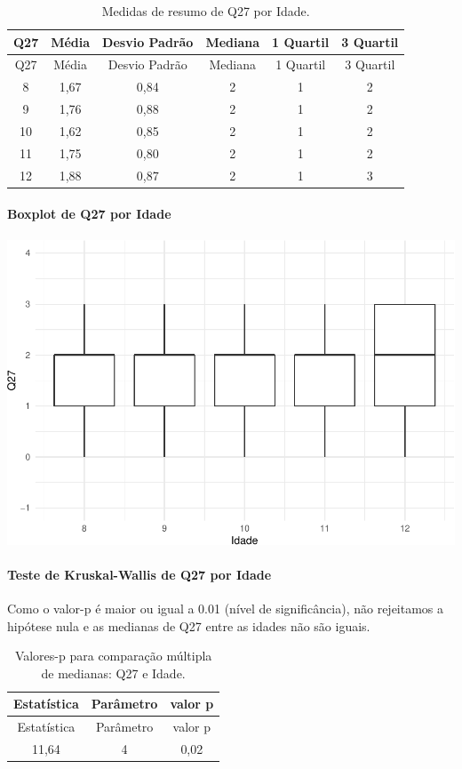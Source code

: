 \documentclass[]{article}
\let\oldparagraph\paragraph
\renewcommand{\paragraph}[1]{\oldparagraph{#1}\mbox{}}
\begin{document}
\begin{longtable}[]{@{}cccccc@{}}
\caption{\label{tab:unnamed-chunk-803}Medidas de resumo de Q27 por Idade.}\tabularnewline
\toprule
Q27 & Média & Desvio Padrão & Mediana & 1 Quartil & 3 Quartil\tabularnewline
\midrule
\endfirsthead
\toprule
Q27 & Média & Desvio Padrão & Mediana & 1 Quartil & 3 Quartil\tabularnewline
\midrule
\endhead
8 & 1,67 & 0,84 & 2 & 1 & 2\tabularnewline
9 & 1,76 & 0,88 & 2 & 1 & 2\tabularnewline
10 & 1,62 & 0,85 & 2 & 1 & 2\tabularnewline
11 & 1,75 & 0,80 & 2 & 1 & 2\tabularnewline
12 & 1,88 & 0,87 & 2 & 1 & 3\tabularnewline
\bottomrule
\end{longtable}

\hypertarget{boxplot-de-q27-por-idade}{%
\paragraph{Boxplot de Q27 por Idade}\label{boxplot-de-q27-por-idade}}

\begin{center}\includegraphics[width=0.75\linewidth]{relatorio_covid19_files/figure-latex/unnamed-chunk-804-1} \end{center}

\hypertarget{teste-de-kruskal-wallis-de-q27-por-idade}{%
\paragraph{Teste de Kruskal-Wallis de Q27 por Idade}\label{teste-de-kruskal-wallis-de-q27-por-idade}}

Como o valor-p é maior ou igual a 0.01 (nível de significância), não rejeitamos a hipótese nula e as medianas de Q27 entre as idades não são iguais.

\begin{longtable}[]{@{}ccc@{}}
\caption{\label{tab:unnamed-chunk-806}Valores-p para comparação múltipla de medianas: Q27 e Idade.}\tabularnewline
\toprule
Estatística & Parâmetro & valor p\tabularnewline
\midrule
\endfirsthead
\toprule
Estatística & Parâmetro & valor p\tabularnewline
\midrule
\endhead
11,64 & 4 & 0,02\tabularnewline
\bottomrule
\end{longtable}
\end{document}
